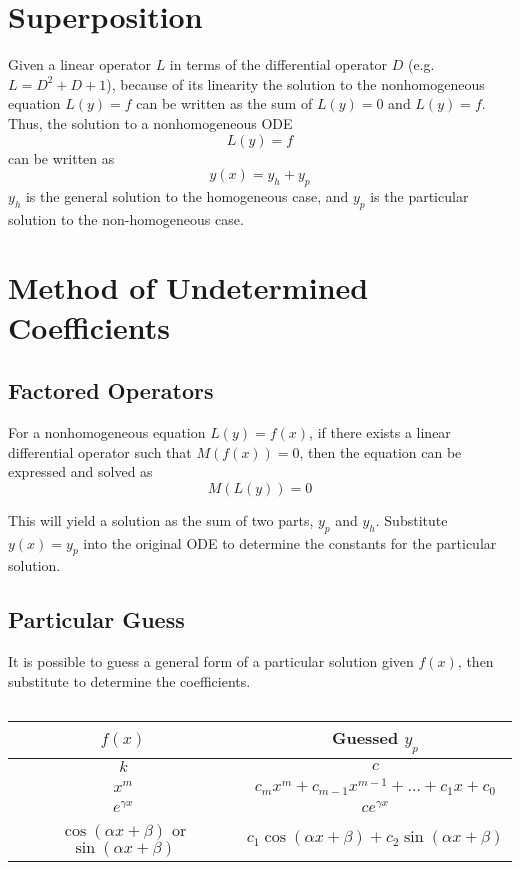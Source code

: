 \documentclass[11pt]{article}
\begin{document}
\section{Superposition}
	Given a linear operator $L$ in terms of the differential operator $D$ (e.g. $L=D^2 + D + 1$), because of its linearity the solution to the nonhomogeneous equation $L(y) = f$ can be written as the sum of $L(y) = 0$ and $L(y) = f$. Thus, the solution to a nonhomogeneous ODE
	\begin{equation}
		L(y) = f
	\end{equation}
	can be written as
	\begin{equation}
		y(x) = y_h + y_p
	\end{equation}
	$y_h$ is the general solution to the homogeneous case, and $y_p$ is the particular solution to the non-homogeneous case.
	
\section{Method of Undetermined Coefficients}
	\subsection{Factored Operators}
		For a nonhomogeneous equation $L(y) = f(x)$, if there exists a linear differential operator such that $M(f(x)) = 0$, then the equation can be expressed and solved as
		\begin{equation}
			M(L(y)) = 0
		\end{equation}
		
		This will yield a solution as the sum of two parts, $y_p$ and $y_h$. Substitute $y(x)=y_p$ into the original ODE to determine the constants for the particular solution.
		
	\subsection{Particular Guess}
		It is possible to guess a general form of a particular solution given $f(x)$, then substitute to determine the coefficients.
		
		\[\]
		
		\begin{tabular}{c|c}
		$f(x)$ & Guessed $y_p$\\\hline
		$k$ & $c$\\
		$x^m$ & $c_mx^m + c_{m-1}x^{m-1} + \ldots + c_1x + c_0$\\
		$e^{\gamma x}$ & $ce^{\gamma x}$\\
		$\cos(\alpha x + \beta)$ or $\sin(\alpha x + \beta)$ & $c_1 \cos(\alpha x + \beta) + c_2\sin(\alpha x + \beta)$
		\end{tabular}
		
\end{document}
